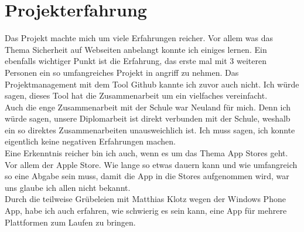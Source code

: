 \section{Projekterfahrung}
Das Projekt machte mich um viele Erfahrungen reicher. Vor allem was das Thema Sicherheit auf Webseiten anbelangt konnte ich einiges lernen. Ein ebenfalls wichtiger Punkt ist die Erfahrung, das erste mal mit 3 weiteren Personen ein so umfangreiches Projekt in angriff zu nehmen. Das Projektmanagement mit dem Tool Github kannte ich zuvor auch nicht. Ich würde sagen, dieses Tool hat die Zusammenarbeit um ein vielfaches vereinfacht.\\
Auch die enge Zusammenarbeit mit der Schule war Neuland für mich. Denn ich würde sagen, unsere Diplomarbeit ist direkt verbunden mit der Schule, weshalb ein so direktes Zusammenarbeiten unausweichlich ist. Ich muss sagen, ich konnte eigentlich keine negativen Erfahrungen machen.\\
Eine Erkenntnis reicher bin ich auch, wenn es um das Thema App Stores geht. Vor allem der Apple Store. Wie lange so etwas dauern kann und wie umfangreich so eine Abgabe sein muss, damit die App in die Stores aufgenommen wird, war uns glaube ich allen nicht bekannt.\\
Durch die teilweise Grübeleien mit Matthias Klotz wegen der Windows Phone App, habe ich auch erfahren, wie schwierig es sein kann, eine App für mehrere Plattformen zum Laufen zu bringen. \\

